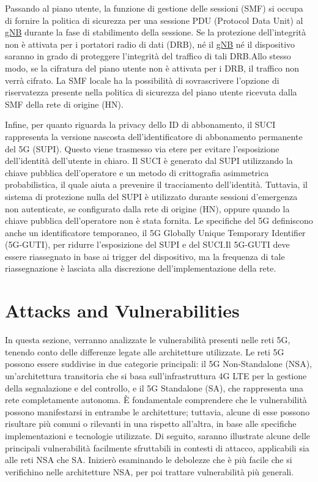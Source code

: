 \documentclass[english]{article}
\begin{document}
Passando al piano utente, la funzione di gestione delle sessioni (SMF) si
occupa di fornire la politica di sicurezza per una sessione PDU (Protocol Data
Unit) al \hyperlink{gNB}{gNB} durante la fase di stabilimento della sessione.
Se la protezione dell'integrità non è attivata per i portatori radio di dati
(DRB), né il \hyperlink{gNB}{gNB} né il dispositivo saranno in grado di
proteggere l'integrità del traffico di tali DRB.\@ Allo stesso modo, se la
cifratura del piano utente non è attivata per i DRB, il traffico non verrà
cifrato. La SMF locale ha la possibilità di sovrascrivere l'opzione di
riservatezza presente nella politica di sicurezza del piano utente ricevuta
dalla SMF della rete di origine (HN).

Infine, per quanto riguarda la privacy dello ID di abbonamento, il SUCI
rappresenta la versione nascosta dell'identificatore di abbonamento permanente
del 5G (SUPI). Questo viene trasmesso via etere per evitare l'esposizione
dell'identità dell'utente in chiaro. Il SUCI è generato dal SUPI utilizzando la
chiave pubblica dell'operatore e un metodo di crittografia asimmetrica
probabilistica, il quale aiuta a prevenire il tracciamento dell'identità.
Tuttavia, il sistema di protezione nulla del SUPI è utilizzato durante sessioni
d'emergenza non autenticate, se configurato dalla rete di origine (HN), oppure
quando la chiave pubblica dell'operatore non è stata fornita. Le specifiche del
5G definiscono anche un identificatore temporaneo, il 5G Globally Unique
Temporary Identifier (5G-GUTI), per ridurre l'esposizione del SUPI e del
SUCI.\@ Il 5G-GUTI deve essere riassegnato in base ai trigger del dispositivo,
ma la frequenza di tale riassegnazione è lasciata alla discrezione
dell'implementazione della rete.
\section{Attacks and Vulnerabilities}\label{sec:5}
In questa sezione, verranno analizzate le vulnerabilità presenti nelle reti 5G,
tenendo conto delle differenze legate alle architetture utilizzate. Le reti 5G
possono essere suddivise in due categorie principali: il 5G Non-Standalone
(NSA), un'architettura transitoria che si basa sull'infrastruttura 4G LTE per
la gestione della segnalazione e del controllo, e il 5G Standalone (SA), che
rappresenta una rete completamente autonoma. È fondamentale comprendere che le
vulnerabilità possono manifestarsi in entrambe le architetture; tuttavia,
alcune di esse possono risultare più comuni o rilevanti in una rispetto
all'altra, in base alle specifiche implementazioni e tecnologie utilizzate. Di
seguito, saranno illustrate alcune delle principali vulnerabilità facilmente
sfruttabili in contesti di attacco, applicabili sia alle reti NSA che SA.\@
Inizierò esaminando le debolezze che è più facile che si verifichino nelle
architetture NSA, per poi trattare vulnerabilità più generali.\@
\end{document}
